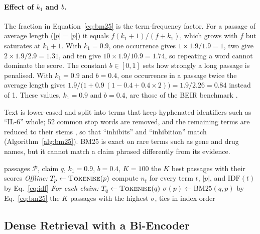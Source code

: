\paragraph{Effect of $k_1$ and $b$.} The fraction in Equation~\eqref{eq:bm25} is the
term-frequency factor. For a passage of average length ($|p| = \overline{|p|}$) it equals
$f(k_1 + 1)/(f + k_1)$, which grows with $f$ but saturates at $k_1 + 1$. With $k_1 = 0.9$, one
occurrence gives $1 \times 1.9 / 1.9 = 1$, two give $2 \times 1.9 / 2.9 = 1.31$, and ten give
$10 \times 1.9 / 10.9 = 1.74$, so repeating a word cannot dominate the score. The constant
$b \in [0, 1]$ sets how strongly a long passage is penalised. With $k_1 = 0.9$ and $b = 0.4$,
one occurrence in a passage twice the average length gives
$1.9 / \bigl(1 + 0.9\,(1 - 0.4 + 0.4 \times 2)\bigr) = 1.9 / 2.26 = 0.84$ instead of 1. These
values, $k_1 = 0.9$ and $b = 0.4$, are those of the BEIR benchmark \parencite{thakur2021beir}.

Text is lower-cased and split into terms that keep hyphenated identifiers such as ``IL-6''
whole; 52 common stop words are removed, and the remaining terms are reduced to their stems
\parencite{porter1980stemming}, so that ``inhibits'' and ``inhibition'' match
(Algorithm~\ref{alg:bm25}). BM25 is exact on rare terms such as gene and drug names, but it
cannot match a claim phrased differently from its evidence.

\begin{algorithm}[t]
\caption{BM25 indexing and search}
\label{alg:bm25}
\begin{algorithmic}[1]
\Require passages $\mathcal{P}$, claim $q$, $k_1 = 0.9$, $b = 0.4$, $K = 100$
\Ensure the $K$ best passages with their scores
\Statex \textit{Offline:}
  \State $T_p \gets \Call{Tokenise}{p}$ 
\EndFor
\State compute $n_t$ for every term $t$, $\overline{|p|}$, and $\mathrm{IDF}(t)$ by Eq.~\eqref{eq:idf}
\Statex \textit{For each claim:}
\State $T_q \gets \Call{Tokenise}{q}$
  \State $\sigma(p) \gets \mathrm{BM25}(q, p)$ by Eq.~\eqref{eq:bm25}
\EndFor
\State \Return the $K$ passages with the highest $\sigma$, ties in index order
\end{algorithmic}
\end{algorithm}

\subsection{Dense Retrieval with a Bi-Encoder}
\label{sec:dense}

